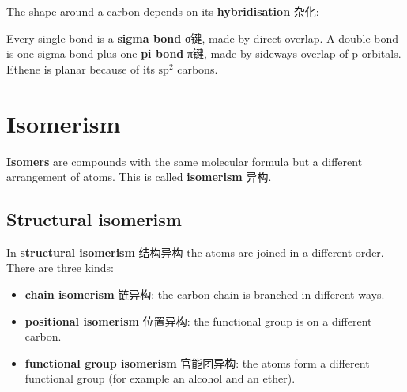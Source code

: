 \documentclass[11pt]{article}
\begin{document}
The shape around a carbon depends on its \textbf{hybridisation} 杂化:

\begin{center}
\end{center}

Every single bond is a \textbf{sigma bond} σ键, made by direct overlap. A double bond is one sigma bond plus one \textbf{pi bond} π键, made by sideways overlap of p orbitals. Ethene is planar because of its $\text{sp}^2$ carbons.

\section*{Isomerism}

\textbf{Isomers} are compounds with the same molecular formula but a different arrangement of atoms. This is called \textbf{isomerism} 异构.

\subsection*{Structural isomerism}

In \textbf{structural isomerism} 结构异构 the atoms are joined in a different order. There are three kinds:

\begin{itemize}
\item \textbf{chain isomerism} 链异构: the carbon chain is branched in different ways.

\item \textbf{positional isomerism} 位置异构: the functional group is on a different carbon.

\item \textbf{functional group isomerism} 官能团异构: the atoms form a different functional group (for example an alcohol and an ether).

\end{itemize}
\end{document}
